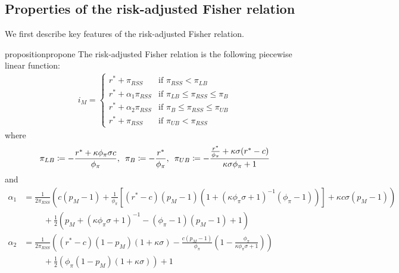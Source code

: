 \documentclass[11pt]{article}
\begin{document}
	\subsection{Properties of the risk-adjusted Fisher relation}	
	
	We first describe key features of the risk-adjusted Fisher relation.
	
	\begin{restatable}{proposition}{propone}
		The risk-adjusted Fisher relation is the following piecewise linear function:
		\begin{align}
		i_M = 
		\begin{cases}
		r^* + \pi_{RSS} & \text{if } \pi_{RSS} < \pi_{LB}\\
		r^* + \alpha_{1}\pi_{RSS} & \text{if } \pi_{LB} \le \pi_{RSS} \le \pi_{B}\\
		r^* + \alpha_{2}\pi_{RSS} & \text{if } \pi_{B} \le \pi_{RSS} \le \pi_{UB}\\
		r^* + \pi_{RSS} & \text{if } \pi_{UB} < \pi_{RSS}			
		\end{cases}
		\end{align}
		\noindent where
		\begin{equation*}
		\pi_{LB} \coloneqq -\frac{r^* + \kappa\phi_{\pi}\sigma c}{\phi_{\pi}},\hspace{0.5em}\pi_{B} \coloneqq -\frac{r^*}{\phi_{\pi}},\hspace{0.5em}\pi_{UB} \coloneqq -\frac{\frac{r^*}{\phi_{\pi}} + \kappa\sigma(r^* - c)}{\kappa\sigma\phi_{\pi} + 1}\\		
		\end{equation*}
		\noindent and 	
		\begin{align*}
		\alpha_{1} &= \frac{1}{2\pi_{RSS}}\left(c(p_M - 1 ) + \frac{1}{\phi_{\pi}}\left[(r^* - c)(p_M - 1)(1+ (\kappa\phi_{\pi}\sigma + 1)^{-1}(\phi_{\pi} - 1))\right] + \kappa c\sigma(p_M -1)\right) \\
		& \hspace{1cm} + \frac{1}{2}\left(p_M + (\kappa\phi_{\pi}\sigma + 1)^{-1} - (\phi_{\pi}-1)(p_M -1) + 1\right)\\
		\alpha_{2} &=\frac{1}{2\pi_{RSS}}\left((r^*-c)(1-p_M)(1+\kappa\sigma) - \frac{c(p_M -1)}{\phi_{\pi}}\left(1-\frac{\phi_{\pi}} {\kappa\phi_{\pi}\sigma + 1}\right)\right) \\
		& \hspace{1cm} + \frac{1}{2}\left(\phi_{\pi}(1-p_M)(1+\kappa\sigma)\right) + 1
		\end{align*}	
	\end{restatable}
\end{document}
